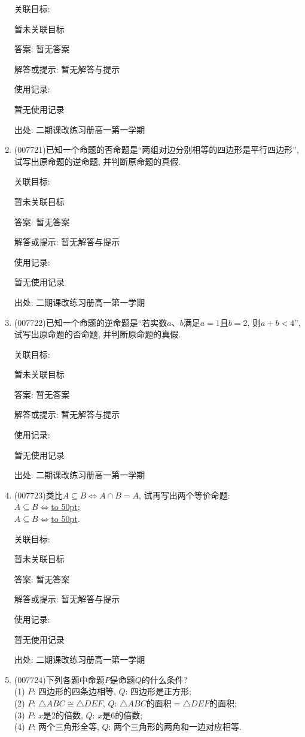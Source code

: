 \documentclass[10pt,a4paper]{article}
\newcommand{\blank}[1]{\underline{\hbox to #1pt{}}}
\begin{document}
\begin{enumerate}[1.]
关联目标:

暂未关联目标

答案: 暂无答案

解答或提示: 暂无解答与提示

使用记录:

暂无使用记录


出处: 二期课改练习册高一第一学期
\item { (007721)}已知一个命题的否命题是``两组对边分别相等的四边形是平行四边形'', 试写出原命题的逆命题, 并判断原命题的真假.


关联目标:

暂未关联目标

答案: 暂无答案

解答或提示: 暂无解答与提示

使用记录:

暂无使用记录


出处: 二期课改练习册高一第一学期
\item { (007722)}已知一个命题的逆命题是``若实数$a$、$b$满足$a=1$且$b=2$, 则$a+b<4$'', 试写出原命题的否命题, 并判断原命题的真假.


关联目标:

暂未关联目标

答案: 暂无答案

解答或提示: 暂无解答与提示

使用记录:

暂无使用记录


出处: 二期课改练习册高一第一学期
\item { (007723)}类比$A\subseteq B\Leftrightarrow A\cap B=A$, 试再写出两个等价命题:\\
$A\subseteq B\Leftrightarrow$\blank{50};\\
$A\subseteq B\Leftrightarrow$\blank{50}.


关联目标:

暂未关联目标

答案: 暂无答案

解答或提示: 暂无解答与提示

使用记录:

暂无使用记录


出处: 二期课改练习册高一第一学期
\item { (007724)}下列各题中命题$P$是命题$Q$的什么条件?\\
(1) $P$: 四边形的四条边相等, $Q$: 四边形是正方形;\\
(2) $P$: $\triangle ABC\cong \triangle DEF$,	$Q$: $\triangle ABC$的面积$=\triangle DEF$的面积;\\
(3) $P$: $x$是$2$的倍数, $Q$: $x$是$6$的倍数;\\
(4) $P$: 两个三角形全等, $Q$: 两个三角形的两角和一边对应相等.



\end{enumerate}
\end{document}

